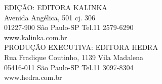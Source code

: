 \vfill
\begin{center}
EDIÇÃO: EDITORA KALINKA\\[7pt]
Avenida Angélica, 501 cj. 306\\[7pt]
01227-900 São Paulo-SP Tel.11 2579-6290\\[7pt]
www.kalinka.com.br\\[30pt]

PRODUÇÃO EXECUTIVA: EDITORA HEDRA\\[7pt]
Rua Fradique Coutinho, 1139 Vila Madalena\\[7pt]
05416-011 São Paulo-SP Tel.11 3097-8304\\[7pt]
www.hedra.com.br
\end{center}
